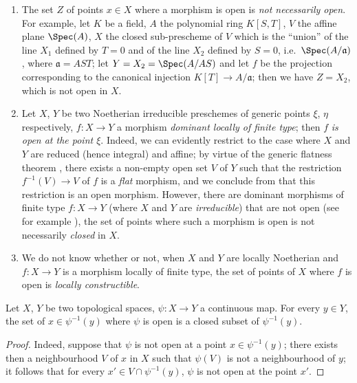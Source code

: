 \begin{remarks}[14.1.3]
\label{IV.14.1.3}
\begin{enumerate}[label=(\roman*)]
  \item The set $Z$ of points $x\in X$ where a morphism is open is \emph{not necessarily open}.
  For example, let $K$ be a field, $A$ the polynomial ring $K[S,T]$, $V$ the affine plane $\Spec(A)$, $X$ the closed sub-prescheme of $V$ which is the ``union'' of the line $X_1$ defined by $T=0$ and of the line $X_2$ defined by $S=0$, i.e.\ $\Spec(A/\mathfrak{a})$, where $\mathfrak{a}=AST$; let $Y=X_2=\Spec(A/AS)$ and let $f$ be the projection corresponding to the canonical injection $K[T]\to A/\mathfrak{a}$; then we have $Z=X_2$, which is not open in $X$.

  \item Let $X$, $Y$ be two Noetherian irreducible preschemes of generic points $\xi$, $\eta$ respectively, $f:X\to Y$ a morphism \emph{dominant locally of finite type}; then $f$ \emph{is open at the point $\xi$}.
  Indeed, we can evidently restrict to the case where $X$ and $Y$ are reduced (hence integral)  and affine; by virtue of the generic flatness theorem , there exists a non-empty open set $V$ of $Y$ such that the restriction $f^{-1}(V)\to V$ of $f$ is a \emph{flat} morphism, and we conclude from  that this restriction is an open morphism.
  However, there are dominant morphisms of finite type $f:X\to Y$ (where $X$ and $Y$ are \emph{irreducible}) that are not open (see for example ), the set of points where such a morphism is open is not necessarily \emph{closed} in $X$.

  \item We do not know whether or not, when $X$ and $Y$ are locally Noetherian and $f:X\to Y$ is a morphism locally of finite type, the set of points of $X$ where $f$ is open is \emph{locally constructible}.
\end{enumerate}
\end{remarks}

\begin{proposition}[14.1.4]
\label{IV.14.1.4}
Let $X$, $Y$ be two topological spaces, $\psi:X\to Y$ a continuous map.
For every $y\in Y$, the set of $x\in\psi^{-1}(y)$ where $\psi$ is open is a closed subset of $\psi^{-1}(y)$.
\end{proposition}

\begin{proof}
Indeed, suppose that $\psi$ is not open at a point $x\in\psi^{-1}(y)$; there exists then a neighbourhood $V$ of $x$ in $X$ such that $\psi(V)$ is not a neighbourhood of $y$; it follows that for every $x'\in V\cap\psi^{-1}(y)$, $\psi$ is not open at the point $x'$.
\end{proof}

